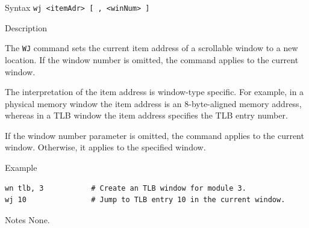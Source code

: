%
%
\pagebreak
{}

\begin{iPageDescEntry}{Syntax}
\texttt{wj <itemAdr> [ , <winNum> ]} \\
\end{iPageDescEntry}

\begin{iPageDescEntry}{Description}

The \texttt{WJ} command sets the current item address of a scrollable window to a
new location. If the window number is omitted, the command applies to the current
window.

The interpretation of the item address is window-type specific.
For example, in a physical memory window the item address is an 8-byte-aligned
memory address, whereas in a TLB window the item address specifies the TLB entry
number.

If the window number parameter is omitted, the command applies to the current window. Otherwise, it applies to the specified window.
\end{iPageDescEntry}

\begin{iPageDescOpEntry}{Example}
\begin{lstlisting}[style=iPageOpStyle]
wn tlb, 3           # Create an TLB window for module 3.
wj 10               # Jump to TLB entry 10 in the current window.

\end{lstlisting}
\end{iPageDescOpEntry}

\begin{iPageDescEntry}{Notes}
None.
\end{iPageDescEntry}

